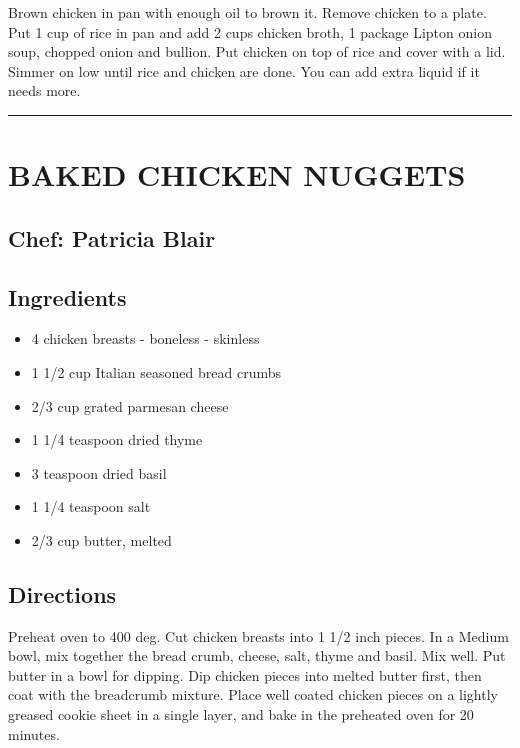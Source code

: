 \documentclass[
]{book}
\providecommand{\tightlist}{%
  \setlength{\itemsep}{0pt}\setlength{\parskip}{0pt}}
\begin{document}
Brown chicken in pan with enough oil to brown it. Remove chicken to a plate.
Put 1 cup of rice in pan and add 2 cups chicken broth, 1 package Lipton onion soup,
chopped onion and bullion. Put chicken on top of rice and cover with a lid. Simmer
on low until rice and chicken are done. You can add extra liquid if it needs more.

\begin{center}\rule{0.5\linewidth}{0.5pt}\end{center}

\hypertarget{baked-chicken-nuggets}{%
\section*{BAKED CHICKEN NUGGETS}\label{baked-chicken-nuggets}}


\hypertarget{chef-patricia-blair-9}{%
\subsection*{Chef: Patricia Blair}\label{chef-patricia-blair-9}}


\hypertarget{ingredients-42}{%
\subsection*{Ingredients}\label{ingredients-42}}


\begin{itemize}
\tightlist
\item
  4 chicken breasts - boneless - skinless
\item
  1 1/2 cup Italian seasoned bread crumbs
\item
  2/3 cup grated parmesan cheese
\item
  1 1/4 teaspoon dried thyme
\item
  3 teaspoon dried basil
\item
  1 1/4 teaspoon salt
\item
  2/3 cup butter, melted
\end{itemize}

\hypertarget{directions-42}{%
\subsection*{Directions}\label{directions-42}}


Preheat oven to 400 deg. Cut chicken breasts into 1 1/2 inch pieces. In a
Medium bowl, mix together the bread crumb, cheese, salt, thyme and basil.
Mix well. Put butter in a bowl for dipping. Dip chicken pieces into melted
butter first, then coat with the breadcrumb mixture. Place well coated chicken
pieces on a lightly greased cookie sheet in a single layer, and bake in
the preheated oven for 20 minutes.
\end{document}
